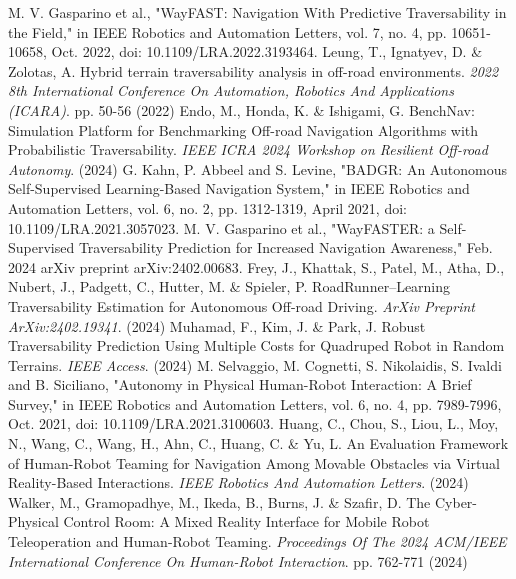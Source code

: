 \documentclass[letterpaper, 10 pt, conference]{ieeeconf}  %
\begin{document}




\begin{thebibliography}{99}

 M. V. Gasparino et al., "WayFAST: Navigation With Predictive Traversability in the Field," in IEEE Robotics and Automation Letters, vol. 7, no. 4, pp. 10651-10658, Oct. 2022, doi: 10.1109/LRA.2022.3193464.
Leung, T., Ignatyev, D. \& Zolotas, A. Hybrid terrain traversability analysis in off-road environments. {\em 2022 8th International Conference On Automation, Robotics And Applications (ICARA)}. pp. 50-56 (2022)
Endo, M., Honda, K. \& Ishigami, G. BenchNav: Simulation Platform for Benchmarking Off-road Navigation Algorithms with Probabilistic Traversability. {\em IEEE ICRA 2024 Workshop on Resilient Off-road Autonomy}. (2024)
 G. Kahn, P. Abbeel and S. Levine, "BADGR: An Autonomous Self-Supervised Learning-Based Navigation System," in IEEE Robotics and Automation Letters, vol. 6, no. 2, pp. 1312-1319, April 2021, doi: 10.1109/LRA.2021.3057023.
 M. V. Gasparino et al., "WayFASTER: a Self-Supervised Traversability Prediction for Increased Navigation Awareness," Feb. 2024 arXiv preprint arXiv:2402.00683.
Frey, J., Khattak, S., Patel, M., Atha, D., Nubert, J., Padgett, C., Hutter, M. \& Spieler, P. RoadRunner–Learning Traversability Estimation for Autonomous Off-road Driving. {\em ArXiv Preprint ArXiv:2402.19341}. (2024)
Muhamad, F., Kim, J. \& Park, J. Robust Traversability Prediction Using Multiple Costs for Quadruped Robot in Random Terrains. {\em IEEE Access}. (2024)
 M. Selvaggio, M. Cognetti, S. Nikolaidis, S. Ivaldi and B. Siciliano, "Autonomy in Physical Human-Robot Interaction: A Brief Survey," in IEEE Robotics and Automation Letters, vol. 6, no. 4, pp. 7989-7996, Oct. 2021, doi: 10.1109/LRA.2021.3100603.
Huang, C., Chou, S., Liou, L., Moy, N., Wang, C., Wang, H., Ahn, C., Huang, C. \& Yu, L. An Evaluation Framework of Human-Robot Teaming for Navigation Among Movable Obstacles via Virtual Reality-Based Interactions. {\em IEEE Robotics And Automation Letters}. (2024)
Walker, M., Gramopadhye, M., Ikeda, B., Burns, J. \& Szafir, D. The Cyber-Physical Control Room: A Mixed Reality Interface for Mobile Robot Teleoperation and Human-Robot Teaming. {\em Proceedings Of The 2024 ACM/IEEE International Conference On Human-Robot Interaction}. pp. 762-771 (2024)

\end{thebibliography}
\end{document}
